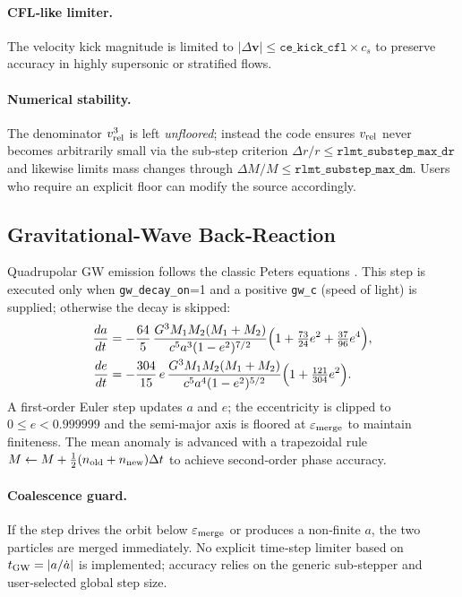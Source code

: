 \documentclass[11pt]{article}
\begin{document}
\paragraph{CFL‑like limiter.}
The velocity kick magnitude is limited to
$|\Delta\mathbf v|\le\texttt{ce\_kick\_cfl}\times c_s$ to preserve accuracy
in highly supersonic or stratified flows.

\paragraph{Numerical stability.}
The denominator $v_{\rm rel}^3$ is left \emph{unfloored}; instead the code
ensures $v_{\rm rel}$ never becomes arbitrarily small via the
sub‑step criterion $\Delta r/r\le\texttt{rlmt\_substep\_max\_dr}$ and likewise
limits mass changes through $\Delta M/M\le\texttt{rlmt\_substep\_max\_dm}$.
Users who require an explicit floor can modify the source accordingly.

\subsection{Gravitational‑Wave Back‑Reaction}
\label{sec:gw}

Quadrupolar GW emission follows the classic Peters equations
\citep{Peters1964}. This step is executed only when
\texttt{gw\_decay\_on}=1 and a positive \texttt{gw\_c} (speed of light) is
supplied; otherwise the decay is skipped:
\begin{align}
\frac{da}{dt} &=
-\frac{64}{5}\,\frac{G^3M_1M_2(M_1+M_2)}{c^5a^3(1-e^2)^{7/2}}
\Bigl(1+\tfrac{73}{24}e^2+\tfrac{37}{96}e^4\Bigr),
\label{eq:da_dt}\\
\frac{de}{dt} &=
-\frac{304}{15}\,e\,\frac{G^3M_1M_2(M_1+M_2)}{c^5a^4(1-e^2)^{5/2}}
\Bigl(1+\tfrac{121}{304}e^2\Bigr).
\label{eq:de_dt}
\end{align}
\noindent A first‑order Euler step updates $a$ and $e$; the eccentricity is
clipped to $0\le e<0.999999$ and the semi‑major axis is floored at
$\varepsilon_{\rm merge}$ to maintain finiteness. The mean anomaly is advanced
with a trapezoidal rule
\(
M\gets M+\tfrac12(n_{\rm old}+n_{\rm new})\Delta t
\)
to achieve second‑order phase accuracy.

\paragraph{Coalescence guard.}
If the step drives the orbit below $\varepsilon_{\rm merge}$ or produces a
non‑finite $a$, the two particles are merged immediately. No explicit
time‑step limiter based on
$t_{\rm GW}=|a/\dot a|$ is implemented; accuracy relies on the generic
sub‑stepper and user‑selected global step size.
\end{document}
